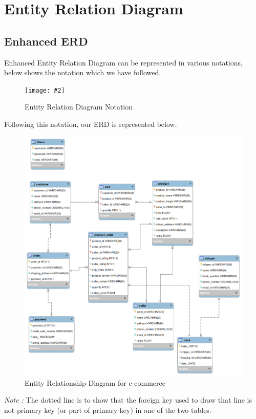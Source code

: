\documentclass[a4paper,12pt]{article}
\newcommand{\iph}[2]{
    \texttt{[image: \#2]}
}
\begin{document}
\section{Entity Relation Diagram}
\subsection{Enhanced ERD}
Enhanced Entity Relation Diagram can be represented in various notations, below shows the notation which we have followed.


\begin{figure}[H]
    \centering
    \iph{0.5}{ERDNotation}
    \caption{Entity Relation Diagram Notation}
\end{figure}

Following this notation, our ERD is represented below.

\begin{figure}[H]
    \centering
    \includegraphics[width=1\textwidth]{ERDL} 
    \caption{Entity Relationship Diagram for e-commerce}
\end{figure}
\textit{Note :} The dotted line is to show that the foreign key used to draw that line is not primary key (or part of primary key) in one of the two tables.
\end{document}
